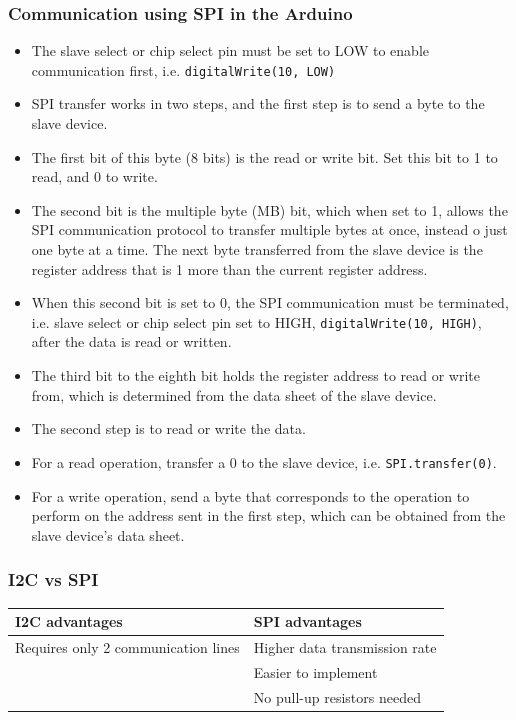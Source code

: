 \documentclass[11pt]{article}
\begin{document}
\subsubsection{Communication using SPI in the Arduino}
\label{sec:org9b32e51}
\begin{itemize}
\item The slave select or chip select pin must be set to LOW to enable communication first, i.e. \texttt{digitalWrite(10, LOW)}
\item SPI transfer works in two steps, and the first step is to send a byte to the slave device.
\item The first bit of this byte (8 bits) is the read or write bit. Set this bit to 1 to read, and 0 to write.
\item The second bit is the multiple byte (MB) bit, which when set to 1, allows the SPI communication protocol to transfer multiple bytes at once, instead o just one byte at a time. The next byte transferred from the slave device is the register address that is 1 more than the current register address.
\item When this second bit is set to 0, the SPI communication must be terminated, i.e. slave select or chip select pin set to HIGH, \texttt{digitalWrite(10, HIGH)}, after the data is read or written.
\item The third bit to the eighth bit holds the register address to read or write from, which is determined from the data sheet of the slave device.
\item The second step is to read or write the data.
\item For a read operation, transfer a 0 to the slave device, i.e. \texttt{SPI.transfer(0)}.
\item For a write operation, send a byte that corresponds to the operation to perform on the address sent in the first step, which can be obtained from the slave device's data sheet.
\end{itemize}
\subsubsection{I2C vs SPI}
\label{sec:org26bf72a}
\begin{center}
\begin{tabular}{l|l}
I2C advantages & SPI advantages\\
\hline
Requires only 2 communication lines & Higher data transmission rate\\
 & Easier to implement\\
 & No pull-up resistors needed\\
\end{tabular}
\end{center}
\end{document}
